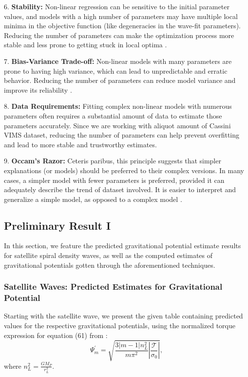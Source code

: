 \documentclass{article}
\begin{document}
6. \textbf{Stability:} Non-linear regression can be sensitive to the initial parameter values, and models with a high number of parameters may have multiple local minima in the objective function (like degeneracies in the wave-fit parameters). Reducing the number of parameters can make the optimization process more stable and less prone to getting stuck in local optima \cite{nocedal2006numerical}.

7. \textbf{Bias-Variance Trade-off:} Non-linear models with many parameters are prone to having high variance, which can lead to unpredictable and erratic behavior. Reducing the number of parameters can reduce model variance and improve its reliability \cite{hastie2009elements}.

8. \textbf{Data Requirements:} Fitting complex non-linear models with numerous parameters often requires a substantial amount of data to estimate those parameters accurately. Since we are working with aliquot amount of Cassini VIMS dataset, reducing the number of parameters can help prevent overfitting and lead to more stable and trustworthy estimates.

9. \textbf{Occam's Razor:} Ceteris paribus, this principle suggests that simpler explanations (or models) should be preferred to their complex versions. In many cases, a simpler model with fewer parameters is preferred, provided it can adequately describe the trend of dataset involved. It is easier to interpret and generalize a simple model, as opposed to a complex model \cite{Sober2015-SOBORA}.





\subsection{Preliminary Result I}
In this section, we feature the predicted gravitational potential estimate results for satellite spiral density waves, as well as the computed estimates of gravitational potentials gotten through the aforementioned techniques. 

\subsubsection{Satellite Waves: Predicted Estimates for Gravitational Potential}
Starting with the satellite wave, we present the given table containing predicted values for the respective gravitational potentials, using the normalized torque expression for equation (61) from \cite{Hedman_2022}:
\begin{equation}
    \Psi_{m}^{'} = \sqrt{\frac{3|m - 1|n_{L}^{2}}{m\pi^{2}} \left|\frac{\mathcal{T}}{\sigma_{0}}\right|},
\end{equation}
where $n_{L}^{2} = \frac{G M_{P}}{r_{L}^{3}}$.
\end{document}
